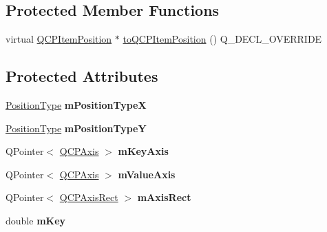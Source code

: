 \subsection*{Protected Member Functions}
\begin{DoxyCompactItemize}
\item 
virtual \hyperlink{classQCPItemPosition}{Q\+C\+P\+Item\+Position} $\ast$ \hyperlink{classQCPItemPosition_a008ff9ebe645a963671b68bcf7f7a1c0}{to\+Q\+C\+P\+Item\+Position} () Q\+\_\+\+D\+E\+C\+L\+\_\+\+O\+V\+E\+R\+R\+I\+DE
\end{DoxyCompactItemize}
\subsection*{Protected Attributes}
\begin{DoxyCompactItemize}
\item 
\hyperlink{classQCPItemPosition_aad9936c22bf43e3d358552f6e86dbdc8}{Position\+Type} {\bfseries m\+Position\+TypeX}\hypertarget{classQCPItemPosition_ae2a617dce057c5f3ec6878c1823aa291}{}\label{classQCPItemPosition_ae2a617dce057c5f3ec6878c1823aa291}

\item 
\hyperlink{classQCPItemPosition_aad9936c22bf43e3d358552f6e86dbdc8}{Position\+Type} {\bfseries m\+Position\+TypeY}\hypertarget{classQCPItemPosition_a47c96c0ef4380e1af4aaa7c2265c260b}{}\label{classQCPItemPosition_a47c96c0ef4380e1af4aaa7c2265c260b}

\item 
Q\+Pointer$<$ \hyperlink{classQCPAxis}{Q\+C\+P\+Axis} $>$ {\bfseries m\+Key\+Axis}\hypertarget{classQCPItemPosition_a63967a33933231e92f68c8ce06bfc37e}{}\label{classQCPItemPosition_a63967a33933231e92f68c8ce06bfc37e}

\item 
Q\+Pointer$<$ \hyperlink{classQCPAxis}{Q\+C\+P\+Axis} $>$ {\bfseries m\+Value\+Axis}\hypertarget{classQCPItemPosition_a505dc2da24ba274452c1c817fcaba011}{}\label{classQCPItemPosition_a505dc2da24ba274452c1c817fcaba011}

\item 
Q\+Pointer$<$ \hyperlink{classQCPAxisRect}{Q\+C\+P\+Axis\+Rect} $>$ {\bfseries m\+Axis\+Rect}\hypertarget{classQCPItemPosition_add40fcb8994c247d85f42a126286b740}{}\label{classQCPItemPosition_add40fcb8994c247d85f42a126286b740}

\item 
double {\bfseries m\+Key}\hypertarget{classQCPItemPosition_a4ff3931ad115603dfb4c7000b24bb415}{}\label{classQCPItemPosition_a4ff3931ad115603dfb4c7000b24bb415}


\end{DoxyCompactItemize}
